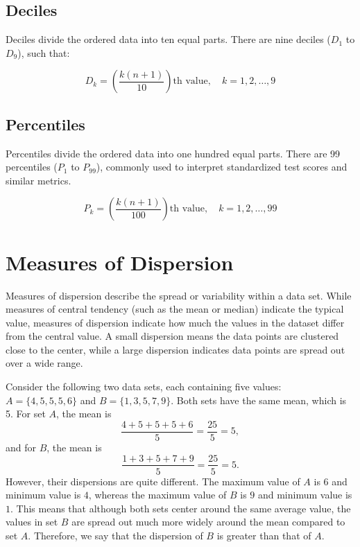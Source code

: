 \documentclass[twoside]{book}
\begin{document}
\subsection{Deciles}

Deciles divide the ordered data into ten equal parts. There are nine deciles ($D_1$ to $D_9$), such that:

\begin{textbox}
\[
D_k = \left( \frac{k(n+1)}{10} \right)\text{th value}, \quad k = 1, 2, \dots, 9
\]
\end{textbox}


\subsection{Percentiles}

Percentiles divide the ordered data into one hundred equal parts. There are 99 percentiles ($P_1$ to $P_{99}$), commonly used to interpret standardized test scores and similar metrics.

\begin{textbox}
\[
P_k = \left( \frac{k(n+1)}{100} \right)\text{th value}, \quad k = 1, 2, \dots, 99
\]
\end{textbox}


\section{Measures of Dispersion}

Measures of dispersion describe the spread or variability within a data set. While measures of central tendency (such as the mean or median) indicate the typical value, measures of dispersion indicate how much the values in the dataset differ from the central value. A small dispersion means the data points are clustered close to the center, while a large dispersion indicates data points are spread out over a wide range.

Consider the following two data sets, each containing five values:
$A = \{4, 5, 5, 5, 6\}$ and $B = \{1, 3, 5, 7, 9\}$.
Both sets have the same mean, which is 5. For set $A$, the mean is
\[
\frac{4 + 5 + 5 + 5 + 6}{5} = \frac{25}{5} = 5,
\]
and for $B$, the mean is
\[
\frac{1 + 3 + 5 + 7 + 9}{5} = \frac{25}{5} = 5.
\]
However, their dispersions are quite different. The maximum value of $A$ is $6$ and minimum value is $4$, whereas the maximum value of $B$ is $9$ and minimum value is $1$. This means that although both sets center around the same average value, the values in set $B$ are spread out much more widely around the mean compared to set $A$. Therefore, we say that the dispersion of $B$ is greater than that of $A$.
\end{document}

